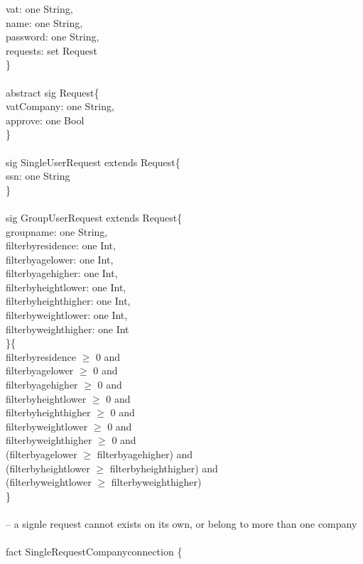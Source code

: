\documentclass{article}
\begin{document}
vat: one String,\\
name: one String,\\
password: one String,\\
requests: set Request \\
\}\\
\\
abstract sig Request\{\\
vatCompany: one String,\\
approve: one Bool\\
\}\\
\\
sig SingleUserRequest extends Request\{\\
ssn: one String\\
\}\\
\\
sig GroupUserRequest extends Request\{\\
groupname: one String,\\
filterbyresidence: one Int,\\
filterbyagelower: one Int,\\
filterbyagehigher: one Int,\\
filterbyheightlower: one Int,\\
filterbyheighthigher: one Int,\\
filterbyweightlower: one Int,\\
filterbyweighthigher: one Int\\
\}\{\\
filterbyresidence $\geq$ 0 and\\
filterbyagelower $\geq$ 0 and\\
filterbyagehigher $\geq$ 0 and\\
filterbyheightlower $\geq$ 0 and\\
filterbyheighthigher $\geq$ 0 and\\
filterbyweightlower $\geq$ 0 and\\
filterbyweighthigher $\geq$ 0 and\\
(filterbyagelower $\geq$ filterbyagehigher) and\\
(filterbyheightlower $\geq$ filterbyheighthigher) and\\
(filterbyweightlower $\geq$ filterbyweighthigher)\\
\}\\
\\
-- a signle request cannot exists on its own, or belong to more than one company\\
\\
fact SingleRequestCompanyconnection \{\\
\end{document}
